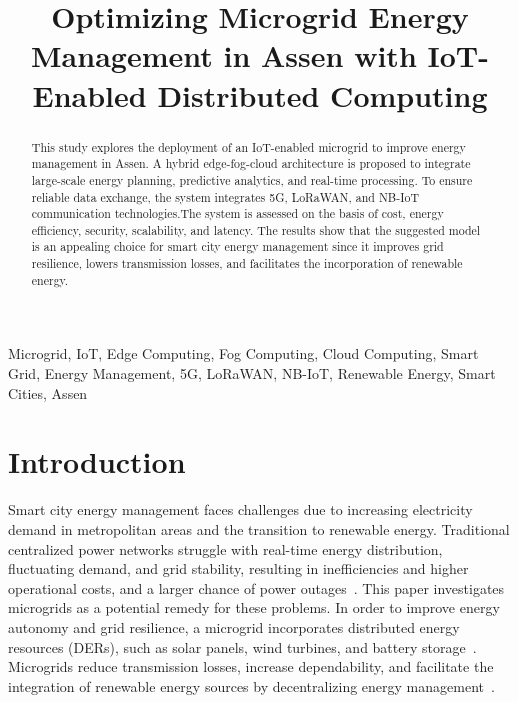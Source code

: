 \documentclass[conference]{IEEEtran}
\begin{document}
\title{Optimizing Microgrid Energy Management in Assen with IoT-Enabled Distributed Computing}

\author{
}

\maketitle

\begin{abstract}
This study explores the deployment of an IoT-enabled microgrid to improve energy management in Assen. A hybrid edge-fog-cloud architecture is proposed to integrate large-scale energy planning, predictive analytics, and real-time processing. To ensure reliable data exchange, the system integrates 5G, LoRaWAN, and NB-IoT communication technologies.The system is assessed on the basis of cost, energy efficiency, security, scalability, and latency. The results show that the suggested model is an appealing choice for smart city energy management since it improves grid resilience, lowers transmission losses, and facilitates the incorporation of renewable energy.
\end{abstract}


\begin{IEEEkeywords}
Microgrid, IoT, Edge Computing, Fog Computing, Cloud Computing, Smart Grid, Energy Management, 5G, LoRaWAN, NB-IoT, Renewable Energy, Smart Cities, Assen
\end{IEEEkeywords}

\section{Introduction}

Smart city energy management faces challenges due to increasing electricity demand in metropolitan areas and the transition to renewable energy. Traditional centralized power networks struggle with real-time energy distribution, fluctuating demand, and grid stability, resulting in inefficiencies and higher operational costs, and a larger chance of power outages~\cite{smartcities4020024}. This paper investigates microgrids as a potential remedy for these problems. In order to improve energy autonomy and grid resilience, a microgrid incorporates distributed energy resources (DERs), such as solar panels, wind turbines, and battery storage~\cite{saeed_practical_2023}. Microgrids reduce transmission losses, increase dependability, and facilitate the integration of renewable energy sources by decentralizing energy management~\cite{smartcities4020024}.
\end{document}
